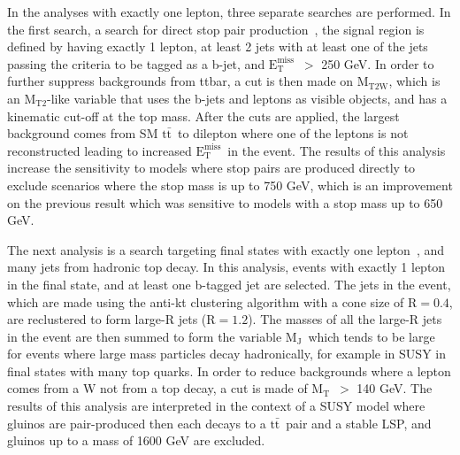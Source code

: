 \documentclass{article}
\newcommand{\MET}{${\mathrm{E_{T}^{miss}}}$}
\newcommand{\ttbar}{${\mathrm{t\bar{t}}}$}
\newcommand{\MJ}{$\mathrm{M_J}$}
\newcommand{\MT}{$\mathrm{M_T}$}
\newcommand{\MTtwo}{$\mathrm{M_{T2}}$}
\begin{document}
In the analyses with exactly one lepton, three separate searches are performed.
In the first search, a search for direct stop pair production~\cite{1lstop2015}, the signal region is defined by having
exactly 1 lepton, at least 2 jets with at least one of the jets passing the criteria to be tagged as a b-jet, and \MET\ $>$ 250 GeV.
In order to further suppress backgrounds from ttbar, a cut is then made on $\mathrm{M_{T2W}}$,
which is an \MTtwo-like variable that uses the b-jets and leptons as visible objects, and has a kinematic cut-off at the top mass.
After the cuts are applied, the largest background comes from SM \ttbar\ to dilepton where one of the leptons is not reconstructed leading to increased \MET\ in the event.
The results of this analysis increase the sensitivity to models where stop pairs are produced directly to exclude scenarios where the stop mass is up to 750 GeV,
which is an improvement on the previous result which was sensitive to models with a stop mass up to 650 GeV.


The next analysis is a search targeting final states with exactly one lepton~\cite{1lmj2015}, and many jets from hadronic top decay.
In this analysis, events with exactly 1 lepton in the final state, and at least one b-tagged jet are selected.
The jets in the event, which are made using the anti-kt clustering algorithm with a cone size of $\mathrm{R=0.4}$, are reclustered to form large-R jets ($\mathrm{R=1.2}$).
The masses of all the large-R jets in the event are then summed to form the variable \MJ\
which tends to be large for events where large mass particles decay hadronically, for example in SUSY in final states with many top quarks.
In order to reduce backgrounds where a lepton comes from a W not from a top decay, a cut is made of \MT\ $>$ 140 GeV.
The results of this analysis are interpreted in the context of a SUSY model where gluinos are pair-produced then each decays to a \ttbar\ pair and a stable LSP,
and gluinos up to a mass of 1600 GeV are excluded.
\end{document}
